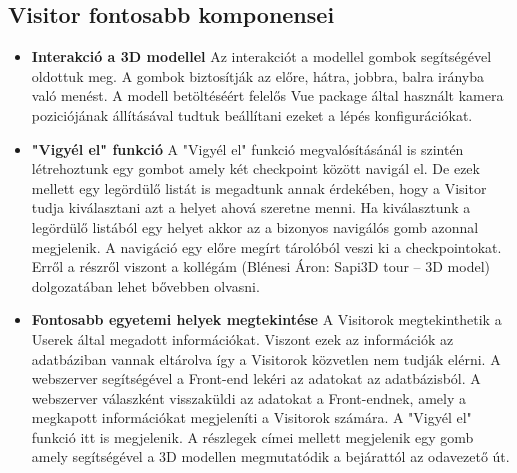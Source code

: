 \subsection{Visitor fontosabb komponensei}
\begin{itemize}
	\item \textbf{Interakció a 3D modellel}
Az interakciót a modellel gombok segítségével oldottuk meg. A gombok biztosítják az előre, hátra, jobbra, balra irányba való menést. A modell betöltéséért felelős Vue package által használt kamera poziciójának állításával tudtuk beállítani ezeket a lépés konfigurációkat.
	
	\item \textbf{"Vigyél el" funkció} 
A "Vigyél el" funkció megvalósításánál is szintén létrehoztunk egy gombot amely két checkpoint között navigál el. De ezek mellett egy legördülő listát is megadtunk annak érdekében, hogy a Visitor tudja kiválasztani azt a helyet ahová szeretne menni. Ha kiválasztunk a legördülő listából egy helyet akkor az a bizonyos navigálós gomb azonnal megjelenik. A navigáció egy előre megírt tárolóból veszi ki a checkpointokat. Erről a részről viszont a kollégám (Blénesi Áron: Sapi3D tour – 3D model) dolgozatában \cite{aronDolgozat} lehet bővebben olvasni.
	
	\item \textbf{Fontosabb egyetemi helyek megtekintése} 
A Visitorok megtekinthetik a Userek által megadott információkat. Viszont ezek az információk az adatbáziban vannak eltárolva így a Visitorok közvetlen nem tudják elérni. A webszerver segítségével a Front-end lekéri az adatokat az adatbázisból. A webszerver válaszként visszaküldi az adatokat a Front-endnek, amely a megkapott információkat megjeleníti a Visitorok számára. A "Vigyél el" funkció itt is megjelenik. A részlegek címei mellett megjelenik egy gomb amely segítségével a 3D modellen megmutatódik a bejárattól az odavezető út.
\end{itemize}

